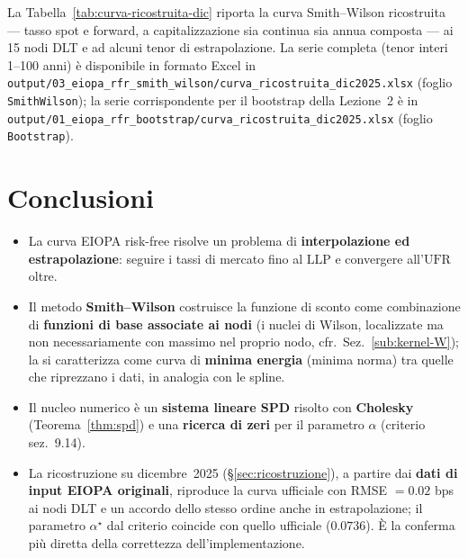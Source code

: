 \documentclass[11pt,a4paper]{article}
\theoremstyle{plain}
\theoremstyle{definition}
\theoremstyle{remark}
\newcommand{\UFR}{\ensuremath{\mathrm{UFR}}}
\newcommand{\LLP}{\ensuremath{\mathrm{LLP}}}
\begin{document}
La Tabella~\ref{tab:curva-ricostruita-dic} riporta la curva Smith--Wilson ricostruita --- tasso
spot e forward, a capitalizzazione sia continua sia annua composta --- ai 15 nodi DLT e ad
alcuni tenor di estrapolazione. La serie completa (tenor interi 1--100 anni) \`e disponibile in
formato Excel in
\texttt{output/03\_eiopa\_rfr\_smith\_wilson/curva\_ricostruita\_dic2025.xlsx}
(foglio \texttt{SmithWilson}); la serie corrispondente per il bootstrap della Lezione~2 \`e in
\texttt{output/01\_eiopa\_rfr\_bootstrap/curva\_ricostruita\_dic2025.xlsx}
(foglio \texttt{Bootstrap}).



\section{Conclusioni}

\begin{itemize}
  \item La curva EIOPA risk-free risolve un problema di \textbf{interpolazione ed
        estrapolazione}: seguire i tassi di mercato fino al $\LLP$ e convergere all'$\UFR$ oltre.
  \item Il metodo \textbf{Smith--Wilson} costruisce la funzione di sconto come combinazione di
        \textbf{funzioni di base associate ai nodi} (i nuclei di Wilson, localizzate ma non
        necessariamente con massimo nel proprio nodo, cfr.~Sez.~\ref{sub:kernel-W}); la si
        caratterizza come curva di \textbf{minima energia} (minima norma) tra quelle che
        riprezzano i dati, in analogia con le spline.
  \item Il nucleo numerico \`e un \textbf{sistema lineare SPD} risolto con \textbf{Cholesky}
        (Teorema~\ref{thm:spd}) e una \textbf{ricerca di zeri} per il parametro $\alpha$
        (criterio sez.~9.14).
  \item La ricostruzione su dicembre~2025 (§\ref{sec:ricostruzione}), a partire dai \textbf{dati
        di input EIOPA originali}, riproduce la curva ufficiale con RMSE $= 0.02$ bps ai nodi DLT
        e un accordo dello stesso ordine anche in estrapolazione; il parametro $\alpha^\star$ dal
        criterio coincide con quello ufficiale ($0.0736$). \`E la conferma pi\`u diretta della
        correttezza dell'implementazione.
\end{itemize}
\end{document}
